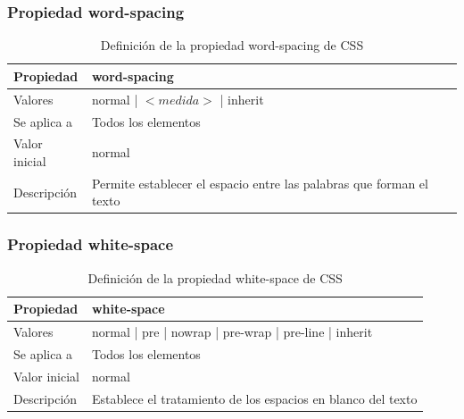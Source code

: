 \begin{frame}
\frametitle{Propiedad word-spacing}

\begin{center}
  \begin{table}
   \begin{tabular}{p{1.8cm}p{7.8cm}}
Propiedad & \bf{word-spacing} \\ \hline
Valores& normal | $<medida>$ | inherit \\ \hline
Se aplica a& Todos los elementos \\ \hline
Valor inicial& normal \\ \hline
Descripción& Permite establecer el espacio entre las palabras que forman el texto \\ \hline
  \end{tabular}
   \caption{Definición de la propiedad word-spacing de CSS}
 \end{table}
\end{center}


\end{frame}



\begin{frame}
\frametitle{Propiedad white-space}

\begin{center}
  \begin{table}
   \begin{tabular}{p{1.8cm}p{7.8cm}}
Propiedad & \bf{white-space} \\ \hline
Valores& normal | pre | nowrap | pre-wrap | pre-line | inherit \\ \hline
Se aplica a& Todos los elementos \\ \hline
Valor inicial& normal \\ \hline
Descripción& Establece el tratamiento de los espacios en blanco del texto \\ \hline
  \end{tabular}
   \caption{Definición de la propiedad white-space de CSS}
 \end{table}
\end{center}


\end{frame}



